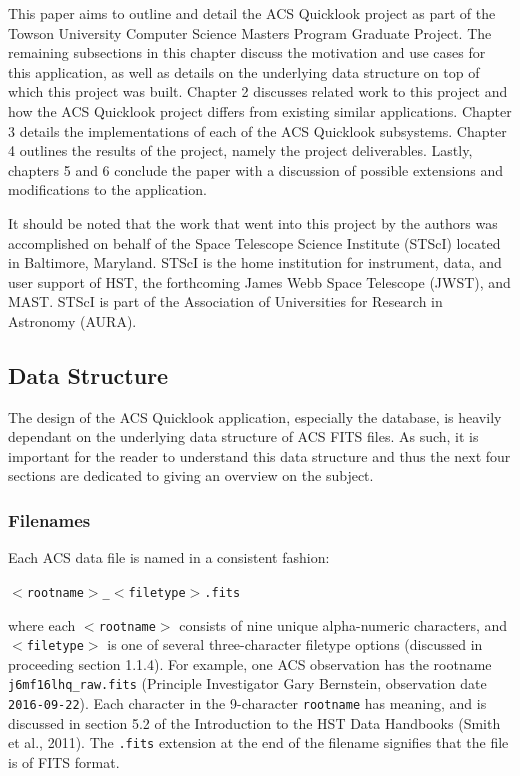 \documentclass[10pt,journal,compsoc]{IEEEtran}
\begin{document}
This paper aims to outline and detail the ACS Quicklook project as part of the Towson
University Computer Science Masters Program Graduate Project.  The remaining subsections
in this chapter discuss the motivation and use cases for this application, as well as
details on the underlying data structure on top of which this project was built.  Chapter
2 discusses related work to this project and how the ACS Quicklook project differs from
existing similar applications.  Chapter 3 details the implementations of each of the
ACS Quicklook subsystems.  Chapter 4 outlines the results of the project, namely the
project deliverables.  Lastly, chapters 5 and 6 conclude the paper with a discussion
of possible extensions and modifications to the application.

It should be noted that the work that went into this project by the authors was
accomplished on behalf of the Space Telescope Science Institute (STScI) located in
Baltimore, Maryland.  STScI is the home institution for instrument, data, and user
support of HST, the forthcoming James Webb Space Telescope
(JWST), and MAST.  STScI is part of the Association of Universities for Research in
Astronomy (AURA).


\subsection{Data Structure}

The design of the ACS Quicklook application, especially the database, is heavily
dependant on the underlying data structure of ACS FITS files.  As such, it is
important for the reader to understand this data structure and thus the next four
sections are dedicated to giving an overview on the subject.

\subsubsection{Filenames}

Each ACS data file is named in a consistent fashion:\newline

\texttt{$<$rootname$>$\_$<$filetype$>$.fits}\newline

\noindent where each \texttt{$<$rootname$>$} consists of nine unique alpha-numeric
characters, and \texttt{$<$filetype$>$} is one of several three-character filetype options
(discussed in proceeding section 1.1.4).  For example, one ACS observation has the rootname
\texttt{j6mf16lhq\_raw.fits} (Principle Investigator Gary Bernstein, observation
date \texttt{2016-09-22}).  Each character in the 9-character \texttt{rootname}
has meaning, and is discussed in section 5.2 of the Introduction to the HST
Data Handbooks (Smith et al., 2011).  The \texttt{.fits} extension at the end
of the filename signifies that the file is of FITS format.
\end{document}
